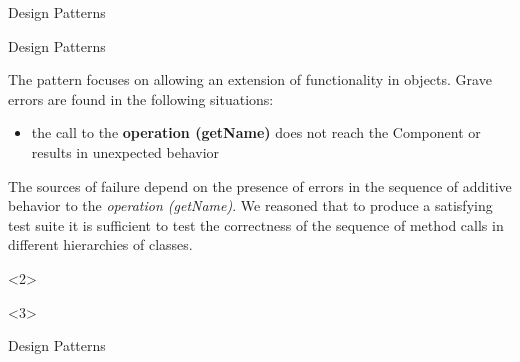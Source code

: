 \documentclass{beamer}
\begin{document}
\begin{section}{Design Patterns}
\begin{subsection}{Design Patterns}
\begin{frame}
{		The pattern focuses on allowing an extension of functionality in objects. Grave errors are found in the following situations:  
		\begin{itemize}
			\item the call to the \textbf{operation (getName)} does not reach the Component or results in unexpected behavior
		\end{itemize}
		\vspace{5mm}
	The sources of failure depend on the presence of errors in the sequence of additive behavior to the \textit{operation (getName)}. We reasoned that to produce a satisfying test suite it is sufficient to test the correctness of the sequence of method calls in different hierarchies of classes.}<2>

		

<3> 		

	\end{frame}
\end{subsection}

\begin{subsection}{Design Patterns}
	\begin{frame}
\end{frame}
\end{subsection}
\end{section}
\end{document}
